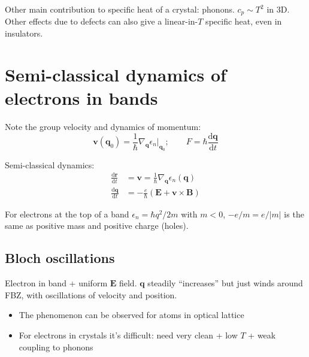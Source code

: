\documentclass[11pt,letterpaper]{article}
\numberwithin{equation}{section} %
\renewcommand*{\vec}[1]{\bm{#1}}
\newcommand{\dif}{\mathrm d}
\begin{document}
Other main contribution to specific heat of a crystal: phonons. $c_p\sim T^2$
in 3D. Other effects due to defects can also give a linear-in-$T$ specific
heat, even in insulators. 

\section{Semi-classical dynamics of electrons in bands}
\label{sec:semi_classical_dynamics_of_electrons_in_bands}
Note the group velocity and dynamics of momentum: 
\begin{equation}
	\vec v(\vec q_0) = \frac 1\hbar \nabla_{\vec q}\epsilon_n |_{\vec q_0};
	\qquad
	F = \hbar\frac{\dif \vec q}{\dif t}
\end{equation}

Semi-classical dynamics: 
\begin{align}
	\frac{\dif \vec r}{\dif t} &= \vec v = \frac 1\hbar \nabla_{\vec
	q}\epsilon_n(\vec q) \\
	\frac{\dif \vec q}{\dif t} &= -\frac{e}{\hbar} (\vec E + \vec v\times
	\vec B)
\end{align}

For electrons at the top of a band $\epsilon_n = \hbar q^2/2m$ with $m<0$,
$-e/m = e/|m|$ is the same as positive mass and positive charge (holes). 

\subsection{Bloch oscillations}
\label{sub:bloch_oscillations}
Electron in band + uniform $\vec E$ field. $\vec q$ steadily ``increases''
but just winds around FBZ, with oscillations of velocity and position. 
\begin{itemize}
  \item The phenomenon can be observed for atoms in optical lattice
  \item For electrons in crystals it's difficult: need very clean + low $T$ +
	  weak coupling to phonons
\end{itemize}
\end{document}

